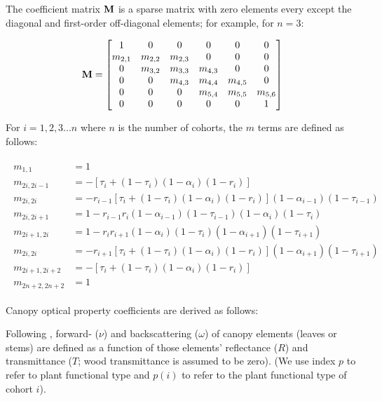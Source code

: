 The coefficient matrix $\mathbf{M}$ is a sparse matrix with zero elements every except the diagonal and first-order off-diagonal elements; for example, for $n=3$:

\begin{equation}
  \mathbf{M} = \begin{bmatrix}
    1 & 0 & 0 & 0 & 0 & 0 \\
    m_{2,1} & m_{2,2} & m_{2,3} & 0 & 0 & 0 \\
    0 & m_{3,2} & m_{3,3} & m_{4,3} & 0 & 0 \\
    0 & 0 & m_{4,3} & m_{4,4} & m_{4,5} & 0 \\
    0 & 0 & 0 & m_{5,4} & m_{5,5} & m_{5,6} \\
    0 & 0 & 0 & 0 & 0 & 1 \\
  \end{bmatrix}
\end{equation}

For $i = 1,2,3...n$ where $n$ is the number of cohorts, the $m$ terms are defined as follows:

\begin{align}
  \begin{split}
    m_{1,1} &= 1\\
    m_{2i,2i-1} &= - \left[ \tau_i + (1 - \tau_i)(1 - \alpha_i)(1 - r_i) \right]\\
    m_{2i,2i} &= -r_{i-1} \left[ \tau_i + (1 - \tau_i)(1 - \alpha_i)(1 - r_i) \right] (1 - \alpha_{i-1})(1 - \tau_{i-1})\\
    m_{2i,2i+1} &= 1 - r_{i-1} r_i (1 - \alpha_{i-1})(1 - \tau_{i-1})(1 - \alpha_i)(1 - \tau_i)\\
    m_{2i+1,2i} &= 1 - r_i r_{i+1} (1 - \alpha_i)(1 - \tau_i)(1 - \alpha_{i+1})(1 - \tau_{i+1})\\
    m_{2i,2i} &= -r_{i+1} \left[ \tau_i + (1 - \tau_i)(1 - \alpha_i)(1 - r_i) \right] (1 - \alpha_{i+1})(1 - \tau_{i+1})\\
    m_{2i+1,2i+2} &= - \left[ \tau_i + (1 - \tau_i)(1 - \alpha_i)(1 - r_i) \right]\\
    m_{2n+2,2n+2} &= 1
  \end{split}
\end{align}

Canopy optical property coefficients are derived as follows:

Following \citet{clm45_note}, forward- ($\nu$) and backscattering ($\omega$) of canopy elements (leaves or stems) are defined as a function of those elements' reflectance ($R$) and transmittance ($T$; wood transmittance is assumed to be zero).
(We use index $p$ to refer to plant functional type and $p(i)$ to refer to the plant functional type of cohort $i$).

